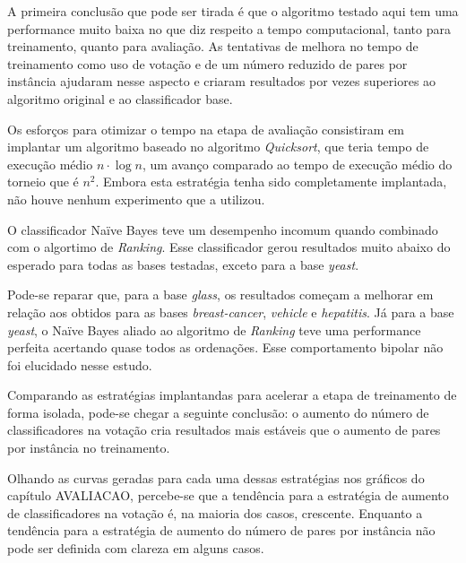 A primeira conclusão que pode ser tirada é que o algoritmo testado aqui tem uma performance muito baixa no que diz respeito a tempo computacional, tanto para treinamento, quanto para avaliação. As tentativas de melhora no tempo de treinamento como uso de votação e de um número reduzido de pares por instância ajudaram nesse aspecto e criaram resultados por vezes superiores ao algoritmo original e ao classificador base.

Os esforços para otimizar o tempo na etapa de avaliação consistiram em implantar um algoritmo baseado no algoritmo \emph{Quicksort}, que teria tempo de execução médio $n\cdot\log{n}$, um avanço comparado ao tempo de execução médio do torneio que é $n^2$. Embora esta estratégia tenha sido completamente implantada, não houve nenhum experimento que a utilizou.

O classificador Naïve Bayes teve um desempenho incomum quando combinado com o algortimo de \emph{Ranking}. Esse classificador gerou resultados muito abaixo do esperado para todas as bases testadas, exceto para a base \emph{yeast}.

Pode-se reparar que, para a base \emph{glass}, os resultados começam a melhorar em relação aos obtidos para as bases \emph{breast-cancer}, \emph{vehicle} e \emph{hepatitis}. Já para a base \emph{yeast}, o Naïve Bayes aliado ao algoritmo de \emph{Ranking} teve uma performance perfeita acertando quase todos as ordenações. Esse comportamento bipolar não foi elucidado nesse estudo.

Comparando as estratégias implantandas para acelerar a etapa de treinamento de forma isolada, pode-se chegar a seguinte conclusão: o aumento do número de classificadores na votação cria resultados mais estáveis que o aumento de pares por instância no treinamento.

Olhando as curvas geradas para cada uma dessas estratégias nos gráficos do capítulo {{AVALIACAO}}, percebe-se que a tendência para a estratégia de aumento de classificadores na votação é, na maioria dos casos, crescente. Enquanto a tendência para a estratégia de aumento do número de pares por instância não pode ser definida com clareza em alguns casos.
